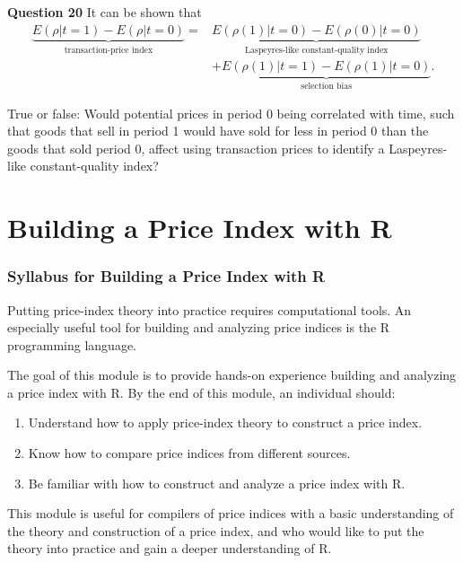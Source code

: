 \documentclass[]{article}
\providecommand{\tightlist}{%
  \setlength{\itemsep}{0pt}\setlength{\parskip}{0pt}}
\begin{document}
\textbf{Question 20} It can be shown that
\begin{align*}
\underbrace{E(\rho | t = 1) - E(\rho | t = 0)}_{\text{transaction-price index}} =& \underbrace{E(\rho(1) | t = 0) - E(\rho(0) | t = 0)}_{\text{Laspeyres-like constant-quality index}} \\ 
&+ \underbrace{E(\rho(1) | t = 1) - E(\rho(1) | t = 0)}_{\text{selection bias}}.
\end{align*}

True or false: Would potential prices in period 0 being correlated with time, such that goods that sell in period 1 would have sold for less in period 0 than the goods that sold period 0, affect using transaction prices to identify a Laspeyres-like constant-quality index?

\hypertarget{part-building-a-price-index-with-r}{%
\part{Building a Price Index with R}\label{part-building-a-price-index-with-r}}

\hypertarget{syllabus-for-building-a-price-index-with-r}{%
\section{Syllabus for Building a Price Index with R}\label{syllabus-for-building-a-price-index-with-r}}

Putting price-index theory into practice requires computational tools. An especially useful tool for building and analyzing price indices is the R programming language.

The goal of this module is to provide hands-on experience building and analyzing a price index with R. By the end of this module, an individual should:

\begin{enumerate}
\def\labelenumi{\arabic{enumi}.}
\tightlist
\item
  Understand how to apply price-index theory to construct a price index.
\item
  Know how to compare price indices from different sources.
\item
  Be familiar with how to construct and analyze a price index with R.
\end{enumerate}

This module is useful for compilers of price indices with a basic understanding of the theory and construction of a price index, and who would like to put the theory into practice and gain a deeper understanding of R.
\end{document}
